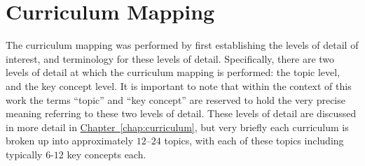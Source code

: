 \documentclass[twoside,12pt,a4paper]{report}
\newcommand{\refchap}[1]{\hyperref[chap:#1]{Chapter~\ref{chap:#1}}}
\begin{document}
\section{Curriculum Mapping}

The curriculum mapping was performed by first establishing the levels of detail of interest, and terminology for these levels of detail. Specifically, there are two levels of detail at which the curriculum mapping is performed: the topic level, and the key concept level. It is important to note that within the context of this work the terms ``topic'' and ``key concept'' are reserved to hold the very precise meaning referring to these two levels of detail. These levels of detail are discussed in more detail in \refchap{curriculum}, but very briefly each curriculum is broken up into approximately $12$--$24$ topics, with each of these topics including typically $6$-$12$ key concepts each. 
\end{document}

